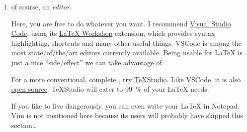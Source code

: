\begin{enumerate}
       Another viable alternative is \href{https://miktex.org/}{MiKTeX}.
       It has a rolling release model, aka updates to packages are published
       whenever they are deemed ready.
       MiKTeX's  (the \emph{MiKTeX Console}) is pretty
       polished and usable, see \cref{fig:miktex_gui}.

       \begin{figure}
       \end{figure}

       You should hit that juicy \emph{Check for updates} at least yearly, rather
       biannually.
       \LaTeX{} is a slow world, in which files from the previous millennium might
       very well still compile and look fine.
       However, a very large share of errors are caused by out\-/of\-/date packages.
       For example, if your \LaTeX{} distribution is ancient (anything older than,
       say, three years), and you then compile a new file that installs a new
       package, you suddenly have that package in its latest version, alongside
       all the old packages.
       That will not go well long.
    \item of course, an \emph{editor}.

       Here, you are free to do whatever you want.
       I recommend \href{https://code.visualstudio.com/}{Visual Studio Code}, using its
       \href{https://marketplace.visualstudio.com/items?itemName=James-Yu.latex-workshop}%
       {\LaTeX{} Workshop} extension, which provides syntax highlighting, shortcuts
       and many other useful things.
       VSCode is among the most state\-/of\-/the\-/art editors currently available.
       Being usable for \LaTeX{} is just a nice \enquote{side\-/effect} we can take
       advantage of.

       For a more conventional, complete ,
       try \href{https://www.texstudio.org/}{TeXStudio}.
       Like VSCode, it is also
       \href{https://github.com/texstudio-org/texstudio}{open source}.
       TeXStudio will cater to \SI{99}{\percent} of your \LaTeX{} needs.

       If you like to live dangerously, you can even write your \LaTeX{} in Notepad.
        Vim is not mentioned here because its users will probably have skipped this
        section\dots{}
\end{enumerate}
